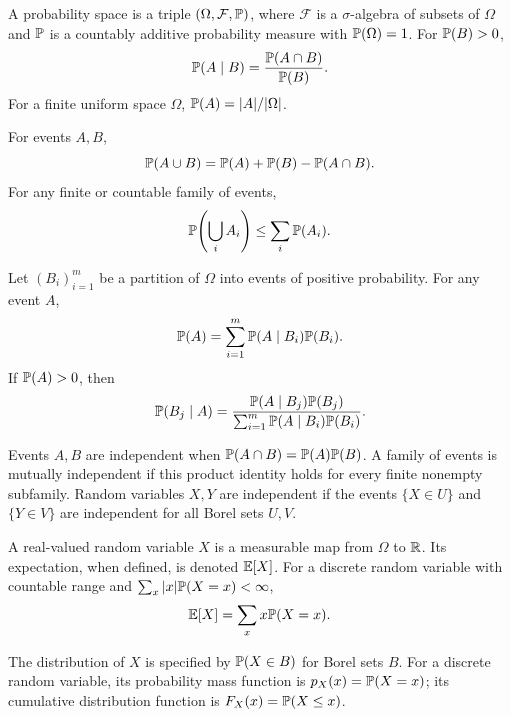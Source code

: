 \begin{definition}
A probability space is a triple $(\Omega, \mathcal{F}, \mathbb{P})$, where $\mathcal{F}$ is a $\sigma$-algebra of subsets of $\Omega$ and $\mathbb{P}$ is a countably additive probability measure with $\mathbb{P}(\Omega)=1$. For $\mathbb{P}(B)>0$,
\[
 \mathbb{P}(A\mid B)=\frac{\mathbb{P}(A\cap B)}{\mathbb{P}(B)}.
\]
For a finite uniform space $\Omega$, $\mathbb{P}(A)=|A|/|\Omega|$.
\end{definition}

\begin{theorem}
For events $A, B$,
\[
 \mathbb{P}(A\cup B)=\mathbb{P}(A)+\mathbb{P}(B)-\mathbb{P}(A\cap B).
\]
For any finite or countable family of events,
\[
 \mathbb{P}\!\left(\bigcup_i A_i\right)\le\sum_i\mathbb{P}(A_i).
\]
\end{theorem}

\begin{theorem}
Let $(B_i)_{i=1}^m$ be a partition of $\Omega$ into events of positive probability. For any event $A$,
\[
 \mathbb{P}(A)=\sum_{i=1}^m\mathbb{P}(A\mid B_i)\mathbb{P}(B_i).
\]
If $\mathbb{P}(A)>0$, then
\[
 \mathbb{P}(B_j\mid A)=
 \frac{\mathbb{P}(A\mid B_j)\mathbb{P}(B_j)}
 {\sum_{i=1}^m\mathbb{P}(A\mid B_i)\mathbb{P}(B_i)}.
\]
\end{theorem}

\begin{definition}[Independence]
Events $A, B$ are independent when $\mathbb{P}(A\cap B)=\mathbb{P}(A)\mathbb{P}(B)$. A family of events is mutually independent if this product identity holds for every finite nonempty subfamily. Random variables $X, Y$ are independent if the events $\{X\in U\}$ and $\{Y\in V\}$ are independent for all Borel sets $U, V$.
\end{definition}

\begin{definition}
A real-valued random variable $X$ is a measurable map from $\Omega$ to $\mathbb{R}$. Its expectation, when defined, is denoted $\mathbb{E}[X]$. For a discrete random variable with countable range and $\sum_x |x|\mathbb{P}(X=x)<\infty$,
\[
 \mathbb{E}[X]=\sum_x x\mathbb{P}(X=x).
\]
\end{definition}


\begin{definition}
The distribution of $X$ is specified by $\mathbb{P}(X\in B)$ for Borel sets $B$. For a discrete random variable, its probability mass function is $p_X(x)=\mathbb{P}(X=x)$; its cumulative distribution function is $F_X(x)=\mathbb{P}(X\le x)$.
\end{definition}

